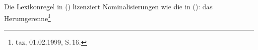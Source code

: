 Die
Lexikonregel in () lizenziert Nominalisierungen
wie die in ():
\ea
das Herumgerenne\footnote{
        taz, 01.02.1999, S.\,16.%
}
\label{ex-herumgerenne-zwei}
\z

